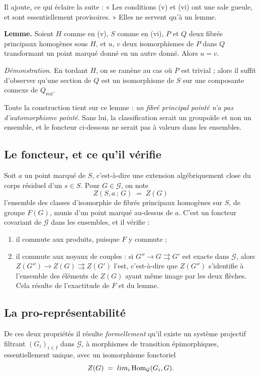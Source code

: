 \documentclass[11pt,a4paper]{article}
\begin{document}
Il ajoute, ce qui éclaire la suite : « Les conditions (v) et
(vi) ont une sale gueule, et sont essentiellement provisoires. » Elles ne
servent qu'à un lemme.

\textbf{Lemme.} Soient $H$ comme en (v), $S$ comme en (vi), $P$ et $Q$ deux
fibrés principaux homogènes sous $H$, et $u$, $v$ deux isomorphismes de $P$
dans $Q$ transformant un point marqué donné en un autre donné. Alors $u = v$.

\emph{Démonstration.} En tordant $H$, on se ramène au cas où $P$ est trivial ;
alors il suffit d'observer qu'une section de $Q$ est un isomorphisme de $S$ sur
une composante connexe de $Q_{\mathrm{r\acute{e}d}}$.

Toute la construction tient sur ce lemme : \emph{un fibré
principal pointé n'a pas d'automorphisme pointé}. Sans lui, la classification
serait un groupoïde et non un ensemble, et le foncteur ci-dessous ne serait
pas à valeurs dans les ensembles.

\subsection*{Le foncteur, et ce qu'il vérifie}

Soit $a$ un point marqué de $S$, c'est-à-dire une extension algébriquement close
du corps résiduel d'un $s \in S$. Pour $G \in \mathcal{G}$, on note
\[
  Z(S, a\,;\, G) \;=\; Z(G)
\]
l'ensemble des classes d'isomorphie de fibrés principaux homogènes sur $S$, de
groupe $F(G)$, munis d'un point marqué au-dessus de $a$. C'est un foncteur
covariant de $\mathcal{G}$ dans les ensembles, et il vérifie :

\begin{enumerate}
  \item[1)] il commute aux produits, puisque $F$ y commute ;
  \item[2)] il commute aux noyaux de couples : si
    $G'' \to G \rightrightarrows G'$ est exacte dans $\mathcal{G}$, alors
    $Z(G'') \to Z(G) \rightrightarrows Z(G')$ l'est, c'est-à-dire que $Z(G'')$
    s'identifie à l'ensemble des éléments de $Z(G)$ ayant même image par les
    deux flèches. Cela résulte de l'exactitude de $F$ et du lemme.
\end{enumerate}

\subsection*{La pro-représentabilité}

De ces deux propriétés il résulte \emph{formellement} qu'il existe un système
projectif filtrant $(G_{i})_{i \in I}$ dans $\mathcal{G}$, à morphismes de
transition épimorphiques, essentiellement unique, avec un isomorphisme
fonctoriel
\[
  Z(G) \;=\; \varinjlim_{i} \operatorname{Hom}_{\mathcal{G}}(G_{i}, G) .
\]
\end{document}
